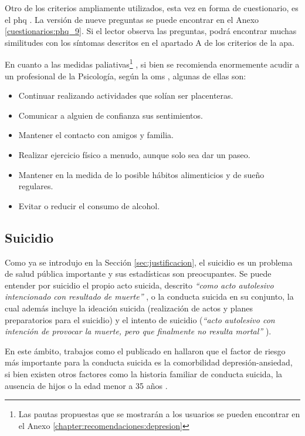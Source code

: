         Otro de los criterios ampliamente utilizados, esta vez en forma de cuestionario, es el \gls{phq} \cite{kroenke_phq-9_2001}. La versión de nueve preguntas se puede encontrar en el Anexo \ref{cuestionarios:phq_9}. Si el lector observa las preguntas, podrá encontrar muchas similitudes con los síntomas descritos en el apartado A de los criterios de la \gls{apa}.

        En cuanto a las medidas paliativas\footnote{Las pautas propuestas que se mostrarán a los usuarios se pueden encontrar en el Anexo \ref{chapter:recomendaciones:depresion}} , si bien se recomienda enormemente acudir a un profesional de la Psicología, según la \gls{oms} \cite{oms_depresion_2023}, algunas de ellas son: 

        \begin{itemize}
            \item Continuar realizando actividades que solían ser placenteras.
            \item Comunicar a alguien de confianza sus sentimientos.
            \item Mantener el contacto con amigos y familia.
            \item Realizar ejercicio físico a menudo, aunque solo sea dar un paseo.
            \item Mantener en la medida de lo posible hábitos alimenticios y de sueño regulares.
            \item Evitar o reducir el consumo de alcohol.
        \end{itemize}

    \subsection{Suicidio}

        Como ya se introdujo en la Sección \ref{sec:justificacion}, el suicidio es un problema de salud pública importante y sus estadísticas son preocupantes. Se puede entender por suicidio el propio acto suicida, descrito \textit{``como acto autolesivo intencionado con resultado de muerte''} \cite{moutier_conducta_2023}, o la conducta suicida en su conjunto, la cual además incluye la ideación suicida (realización de actos y planes preparatorios para el suicidio) y el intento de suicidio (\textit{``acto autolesivo con intención de provocar la muerte, pero que finalmente no resulta mortal''} \cite{moutier_conducta_2023}).

        En este ámbito, trabajos como el publicado en \cite{baca_garcia_factores_2014} hallaron que el factor de riesgo más importante para la conducta suicida es la \gls{comorbilidad} depresión-ansiedad, si bien existen otros factores como la historia familiar de conducta suicida, la ausencia de hijos o la edad menor a 35 años \cite{baca_garcia_factores_2014}.
        
